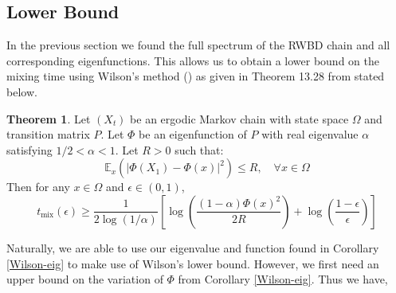 \documentclass{article}
\theoremstyle{definition}
\theoremstyle{definition}
\newtheorem{theorem}{Theorem}
\theoremstyle{definition}
\theoremstyle{definition}
\theoremstyle{named}
\begin{document}
\subsection{Lower Bound}
In the previous section we found the full spectrum of the RWBD chain and all corresponding eigenfunctions. This allows us to obtain a lower bound on the mixing time using Wilson's method (\cite{Wilson_2004}) as given in Theorem 13.28 from \cite{levin_markov_2017} stated below.
\begin{theorem}
   \label{wilson}
   Let $(X_t)$ be an ergodic Markov chain with state space $\Omega$ and transition matrix $P$. Let $\Phi$ be an eigenfunction of $P$ with real eigenvalue $\alpha$ satisfying $1/2 < \alpha< 1$. Let $R>0$ such that:
   \[\mathbb{E}_x\left(|\Phi(X_1)-\Phi(x)|^2\right)\leq R,\quad \forall x\in \Omega\]
   Then for any $x\in \Omega$ and $\epsilon\in (0,1)$,
   \[t_\text{mix}(\epsilon) \geq \frac{1}{2\log(1/\alpha)}\left[\log \left(\frac{(1-\alpha)\Phi(x)^2}{2R}\right) + \log\left(\frac{1-\epsilon}{\epsilon}\right)\right]\]
\end{theorem}
\noindent Naturally, we are able to use our eigenvalue and function found in Corollary \ref{Wilson-eig} to make use of Wilson's lower bound. However, we first need an upper bound on the variation of $\Phi$ from Corollary \ref{Wilson-eig}. Thus we have,
\end{document}
